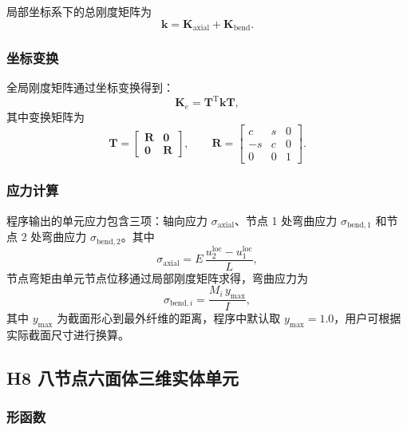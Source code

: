 \documentclass[UTF8,a4paper,zihao=-4]{ctexart}
\newcommand{\T}{\mathrm{T}}
\newcommand{\Kmat}{\bm{K}}
\newcommand{\kmat}{\bm{k}}
\newcommand{\Tmat}{\bm{T}}
\begin{document}
局部坐标系下的总刚度矩阵为
\begin{equation}
    \kmat = \Kmat_{\mathrm{axial}} + \Kmat_{\mathrm{bend}}.
\end{equation}

\subsubsection{坐标变换}

全局刚度矩阵通过坐标变换得到：
\begin{equation}
    \Kmat_e = \Tmat^{\T} \kmat \Tmat,
\end{equation}
其中变换矩阵为
\begin{equation}
    \Tmat =
    \begin{bmatrix}
        \bm{R} & \bm{0}\\
        \bm{0} & \bm{R}
    \end{bmatrix},
    \qquad
    \bm{R} =
    \begin{bmatrix}
        c & s & 0\\
        -s & c & 0\\
        0 & 0 & 1
    \end{bmatrix}.
\end{equation}

\subsubsection{应力计算}

程序输出的单元应力包含三项：轴向应力 $\sigma_{\mathrm{axial}}$、节点 1 处弯曲应力 $\sigma_{\mathrm{bend},1}$ 和节点 2 处弯曲应力 $\sigma_{\mathrm{bend},2}$。其中
\begin{equation}
    \sigma_{\mathrm{axial}} = E\,\frac{u_2^{\mathrm{loc}}-u_1^{\mathrm{loc}}}{L},
\end{equation}
节点弯矩由单元节点位移通过局部刚度矩阵求得，弯曲应力为
\begin{equation}
    \sigma_{\mathrm{bend},i} = \frac{M_i\,y_{\max}}{I},
\end{equation}
其中 $y_{\max}$ 为截面形心到最外纤维的距离，程序中默认取 $y_{\max}=1.0$，用户可根据实际截面尺寸进行换算。

\subsection{H8 八节点六面体三维实体单元}

\subsubsection{形函数}
\end{document}
